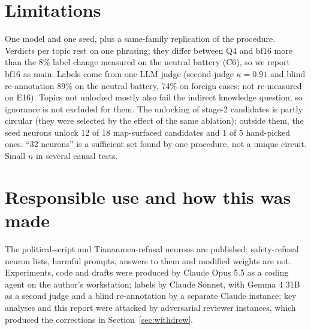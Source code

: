 \documentclass[10pt,a4paper]{article}
\begin{document}
\section{Limitations}
One model and one seed, plus a same-family replication of the procedure. Verdicts per topic rest on one phrasing; they
differ between Q4 and bf16 more than the 8\% label change measured on the neutral battery (C6), so we report bf16 as main.
Labels come from one LLM judge (second-judge $\kappa=0.91$ and blind re-annotation 89\% on the neutral battery, 74\% on
foreign cases; not re-measured on E16). Topics not unlocked mostly also fail the indirect knowledge question, so ignorance is
not excluded for them. The unlocking of stage-2 candidates is partly circular (they were selected by the effect of the same
ablation): outside them, the seed neurons unlock 12 of 18 map-surfaced candidates and 1 of 5 hand-picked ones. ``32 neurons'' is a sufficient set found by one procedure, not a unique circuit. Small $n$ in several
causal tests.

\section{Responsible use and how this was made}\label{sec:howmade}
The political-script and Tiananmen-refusal neurons are published; safety-refusal neuron lists, harmful prompts, answers to
them and modified weights are not. Experiments, code and drafts were produced by Claude Opus 5.5 as a coding agent on the
author's workstation; labels by Claude Sonnet, with Gemma 4 31B as a second judge and a blind re-annotation by a separate
Claude instance; key analyses and this report were attacked by adversarial reviewer instances, which produced the
corrections in Section~\ref{sec:withdrew}.

\appendix
\end{document}
